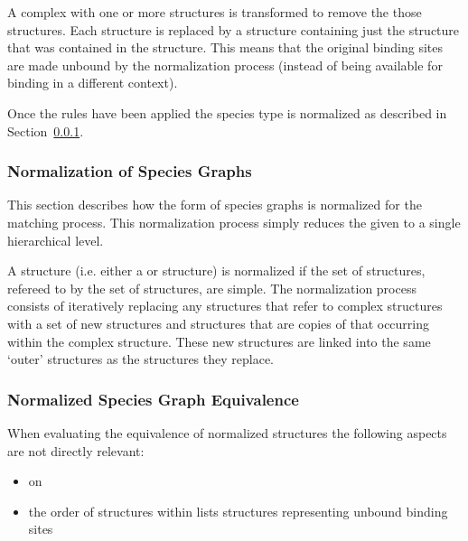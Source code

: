 \documentclass{cekarticle}
\begin{document}
A complex  with one or more 
structures is transformed to remove the those 
structures. Each  structure is replaced by a
 structure containing just the
 structure that was contained in the
 structure.  This means that the original
binding sites are made unbound by the normalization process
(instead of being available for binding in a different context).

Once the rules have been applied the species type is normalized as
described in Section~\ref{sec:norm-graphs}.

\subsubsection{Normalization of Species Graphs}
\label{sec:norm-graphs}

This section describes how the form of species graphs is
normalized for the matching process.  This normalization process
simply reduces the given  to a single
hierarchical level.

A  structure (i.e. either a
 or  structure)
is normalized if the set of  structures,
refereed to by the set of  structures,
are simple. The normalization process consists of iteratively
replacing any  structures that refer to
complex  structures with a set of new
 structures and 
structures that are copies of that occurring within the complex
 structure.  These new structures are linked
into the same `outer'  structures as the
 structures they replace.

\subsubsection{Normalized Species Graph Equivalence}
\label{sec:match-graphs}

When evaluating the equivalence of normalized 
structures the following aspects are not directly relevant:
\begin{itemize}
\item {} on 

\item the order of structures within lists 
structures representing unbound binding sites
\end{itemize}
\end{document}
